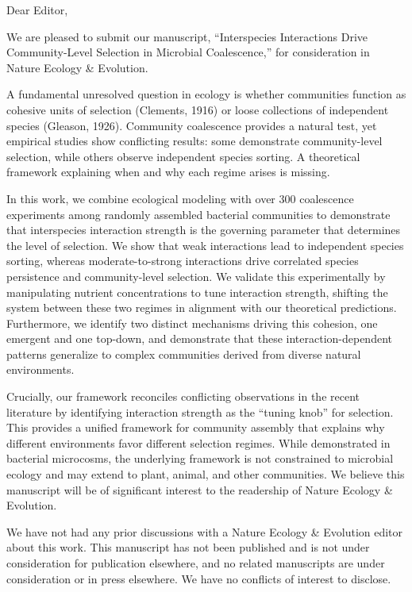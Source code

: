 \documentclass[11pt]{letter}
\begin{document}
\begin{letter}{}

\opening{Dear Editor,}

We are pleased to submit our manuscript, ``Interspecies Interactions Drive Community-Level Selection in Microbial Coalescence,'' for consideration in Nature Ecology \& Evolution.

A fundamental unresolved question in ecology is whether communities function as cohesive units of selection (Clements, 1916) or loose collections of independent species (Gleason, 1926). Community coalescence provides a natural test, yet empirical studies show conflicting results: some demonstrate community-level selection, while others observe independent species sorting. A theoretical framework explaining when and why each regime arises is missing.

In this work, we combine ecological modeling with over 300 coalescence experiments among randomly assembled bacterial communities to demonstrate that interspecies interaction strength is the governing parameter that determines the level of selection. We show that weak interactions lead to independent species sorting, whereas moderate-to-strong interactions drive correlated species persistence and community-level selection. We validate this experimentally by manipulating nutrient concentrations to tune interaction strength, shifting the system between these two regimes in alignment with our theoretical predictions. Furthermore, we identify two distinct mechanisms driving this cohesion, one emergent and one top-down, and demonstrate that these interaction-dependent patterns generalize to complex communities derived from diverse natural environments.

Crucially, our framework reconciles conflicting observations in the recent literature by identifying interaction strength as the ``tuning knob'' for selection. This provides a unified framework for community assembly that explains why different environments favor different selection regimes. While demonstrated in bacterial microcosms, the underlying framework is not constrained to microbial ecology and may extend to plant, animal, and other communities. We believe this manuscript will be of significant interest to the readership of Nature Ecology \& Evolution.

We have not had any prior discussions with a Nature Ecology \& Evolution editor about this work. This manuscript has not been published and is not under consideration for publication elsewhere, and no related manuscripts are under consideration or in press elsewhere. We have no conflicts of interest to disclose.


\end{letter}
\end{document}

